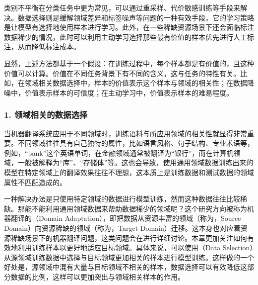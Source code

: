 \parinterval 类别不平衡在分类任务中更为常见，可以通过重采样、代价敏感训练等手段来解决。数据选择则是缓解领域差异和标签噪声等问题的一种有效手段，它的学习策略是让模型有选择地使用样本进行学习。此外，在一些稀缺资源场景下还会面临标注数据稀少的情况，此时可以利用主动学习选择那些最有价值的样本优先进行人工标注，从而降低标注成本。

\parinterval 显然，上述方法都基于一个假设：在训练过程中，每个样本都是有价值的，且这种价值可以计算。价值在不同任务背景下有不同的含义，这与任务的特性有关。比如，在领域相关数据选择中，样本的价值表示这个样本与领域的相关性；在数据降噪中，价值表示样本的可信度；在主动学习中，价值表示样本的难易程度。


\subsubsection{1. 领域相关的数据选择}

\parinterval 当机器翻译系统应用于不同领域时，训练语料与所应用领域的相关性就显得非常重要。不同领域往往具有自己独特的属性，比如语言风格、句子结构、专业术语等，例如，“bank”这个英语单词，在金融领域通常被翻译为“银行”，而在计算机领域，一般被解释为“库”、“存储体”等。这也会导致，使用通用领域数据训练出来的模型在特定领域上的翻译效果往往不理想，这本质上是训练数据和测试数据的领域属性不匹配造成的。

\parinterval 一种解决办法是只使用特定领域的数据进行模型训练，然而这种数据往往比较稀缺。那能不能利用通用领域数据来帮助数据稀少的领域呢？这个研究方向被称为机器翻译的{\small{}}（Domain Adaptation），即把数据从资源丰富的领域（称为{\small{}}，Source Domain）向资源稀缺的领域（称为{\small{}}，Target Domain）迁移。这本身也对应着资源稀缺场景下的机器翻译问题，这类问题会在{\chaptersixteen}进行详细讨论。本章更加关注如何有效地利用训练样本以更好地适应目标领域。具体来说，可以使用{\small{}}（Data Selection）从源领域训练数据中选择与目标领域更加相关的样本进行模型训练。这样做的一个好处是，源领域中混有大量与目标领域不相关的样本，数据选择可以有效降低这部分数据的比例，这样可以更加突出与领域相关样本的作用。

